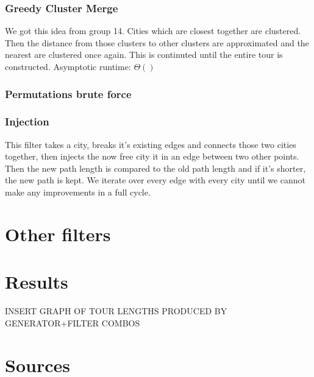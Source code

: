 \documentclass{article}
\begin{document}
\section*{Greedy Cluster Merge}%
We got this idea from group 14. Cities which are closest together are clustered. Then the distance from those clusters to other clusters are approximated and the nearest are clustered once again. This is continuted until the entire tour is constructed. Asymptotic runtime: $\Theta ()$ 
\section*{Permutations brute force}%

\section*{Injection}%
This filter takes a city, breaks it's existing edges and connects those two cities together, then injects the now free city it in an edge between two other points. Then the new path length is compared to the old path length and if it's shorter, the new path is kept. We iterate over every edge with every city until we cannot make any improvements in a full cycle.

\section*{}

\part*{Other filters}

\part*{Results}
INSERT GRAPH OF TOUR LENGTHS PRODUCED BY GENERATOR+FILTER COMBOS


\part*{Sources}
\end{document}
